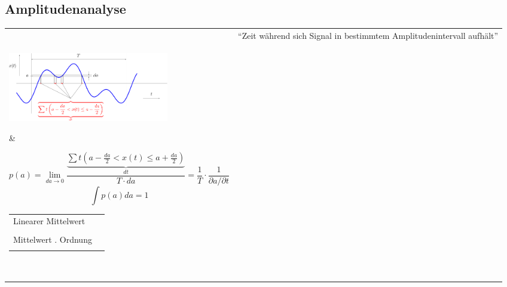 \subsection{Amplitudenanalyse }
\begin{tabular}{ll}
	& ``Zeit während sich Signal in bestimmtem Amplitudenintervall aufhält'' \\
\parbox{7cm}{
	\includegraphics[width=7cm]{./bilder/amplitudenanalyse.png}
	}
	& \begin{minipage}[]{11cm}
			$$p(a) = \lim_{da\rightarrow 0}\frac{\underbrace{\sum t\left(
			a-\frac{da}{2}<x(t)\leq a+\frac{da}{2}\right)}_{dt}}{T\cdot da} = \frac{1}{T}\cdot
			\frac{1}{\partial a/ \partial t}$$
			$$\int p(a) da = 1$$
			
			\begin{tabular}{ll}
            Linearer Mittelwert 
            	& \fbox{$X_0  = \int\limits_{-\infty}^{\infty}a\cdot p(a)da$} \\ \\ 
            Mittelwert $n$. Ordnung 
            	& \fbox{$X^n = \int\limits_{-\infty}^{\infty}a^n\cdot p(a)da$} \\ \\
            \end{tabular}
      \end{minipage} \\
\end{tabular}
\newpage
